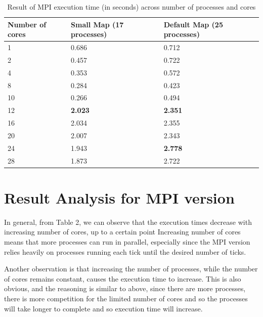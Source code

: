 \documentclass[12pt]{article}
\begin{document}
\begin{table}[]
\begin{tabular}{|l|l|l|}
\hline
Number of cores & Small Map (17 processes) & Default Map (25 processes) \\ \hline
1                & 0.686              & 0.712                    \\ \hline
2                & 0.457            & 0.722                    \\ \hline
4                & 0.353              & 0.572                    \\ \hline
8                & 0.284              & 0.423                    \\ \hline
10               & 0.266              & 0.494                    \\ \hline
12               & \textbf{2.023}              & \textbf{2.351}                    \\ \hline
16               & 2.034              & 2.355                    \\ \hline
20               & 2.007              & 2.343                    \\ \hline
24               & 1.943              & \textbf{2.778}                    \\ \hline
28               & 1.873              & 2.722                    \\ \hline

\end{tabular}
\caption{Result of MPI execution time (in seconds) across number of processes and cores}
\end{table}

\section{Result Analysis for MPI version}

In general, from Table 2, we can observe that the execution times decrease with increasing number of cores, up to a certain point Increasing number of cores means that more processes can run in parallel, especially since the MPI version relies heavily on processes running each tick until the desired number of ticks.

\bigbreak \noindent Another observation is that increasing the number of processes, while the number of cores remains constant, causes the execution time to increase. This is also obvious, and the reasoning is similar to above, since there are more processes, there is more competition for the limited number of cores and so the processes will take longer to complete and so execution time will increase.
\end{document}
